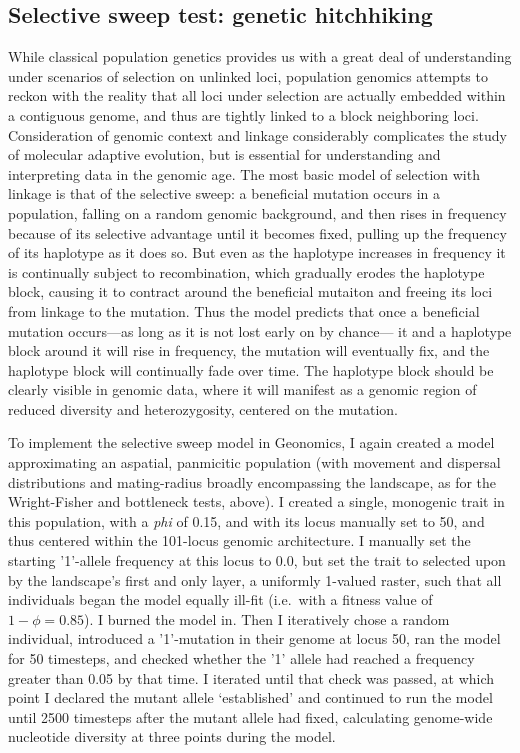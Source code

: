 ﻿\documentclass{article}
\begin{document}
\subsection{Selective sweep test: genetic hitchhiking}
While classical population genetics provides us with a great
deal of understanding under scenarios of selection 
on unlinked loci, population genomics attempts to reckon
with the reality that all loci under selection are actually
embedded within a contiguous genome, and thus are tightly linked
to a block neighboring loci. Consideration of genomic context and linkage
considerably complicates the study of molecular adaptive evolution, but is
essential for understanding and interpreting data in the genomic age. The
most basic model of selection with linkage is that of the selective sweep:
a beneficial mutation occurs in a population, falling on a
random genomic background, and then rises in frequency because of its
selective advantage until it becomes fixed, pulling up the frequency of its
haplotype as it does so. But even as the haplotype increases in frequency it is
continually subject to recombination, which gradually erodes the haplotype block,
causing it to contract around the beneficial mutaiton and freeing its
loci from linkage to the mutation. Thus the model predicts that once a
beneficial mutation occurs---as long as it is not lost early on by chance---
it and a haplotype block around it will rise in frequency, the mutation will
eventually fix, and the haplotype block will continually fade over time.
The haplotype block should be clearly visible in genomic data, where it will
manifest as a genomic region of reduced diversity and heterozygosity, centered
on the mutation.

To implement the selective sweep model in Geonomics, I again created a model
approximating an aspatial, panmicitic population (with movement and dispersal
distributions and mating-radius broadly encompassing the landscape, as for
the Wright-Fisher and bottleneck tests, above).
I created a single, monogenic trait in this population, with a \emph{phi} of
0.15, and with its locus manually set to 50, and thus centered
within the 101-locus genomic architecture. I manually set the starting 
'1'-allele frequency at this locus to 0.0, but set the trait to selected upon
by the landscape's first and only layer, a uniformly 1-valued raster, such
that all individuals began the model equally ill-fit (i.e.\ with a fitness value of
$1 - \phi = 0.85$). I burned the model in. Then I iteratively chose a random individual,
introduced a '1'-mutation in their genome at locus 50, ran the model for 50 timesteps,
and checked whether the '1' allele had reached a frequency greater than 0.05 by that
time. I iterated until that check was passed, at which point I declared
the mutant allele `established' and continued to run the model until 2500 timesteps
after the mutant allele had fixed, calculating genome-wide nucleotide diversity
at three points during the model.
\end{document}

